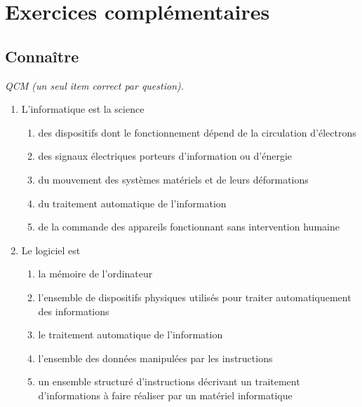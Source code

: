 \newpage
\section{Exercices complémentaires}

\subsection{Connaître}
\begin{td}\label{td:qcm}\em QCM (un seul item correct par question).
\begin{enumerate}
\item L'informatique est la science
	\begin{enumerate}
	\item des dispositifs dont le fonctionnement dépend de 
		la circulation d'électrons
	\item des signaux électriques porteurs d'information ou d'énergie
	\item du mouvement des systèmes matériels et de leurs déformations
	\item du traitement automatique de l'information
	\item de la commande des appareils fonctionnant sans intervention humaine
	\end{enumerate}
\item Le logiciel est
	\begin{enumerate}
	\item la mémoire de l'ordinateur
	\item l'ensemble de dispositifs physiques utilisés pour traiter
		automatiquement des informations
	\item le traitement automatique de l'information
	\item l'ensemble des données manipulées par les instructions
	\item un ensemble structuré d'instructions décrivant un traitement d'informations
		à faire réaliser par un matériel informatique

\end{enumerate}
\end{enumerate}
\end{td}
